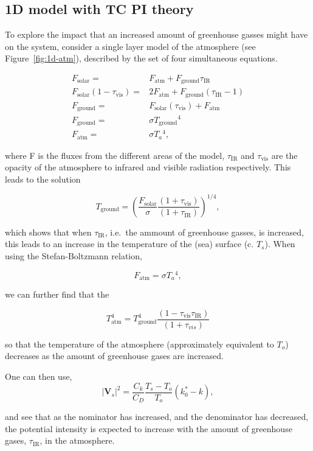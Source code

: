 \subsection{1D model with TC PI theory}
\label{sec:1d-hurr}
To explore the impact that an increased amount of greenhouse gasses might have
on the system, consider a single layer model of the atmosphere (see Figure~\ref{fig:1d-atm}), described by the
set of four simultaneous equations.



\begin{eqnarray}
F_{\mathrm{solar}} =& F_{\mathrm{atm}} + F_{\mathrm{ground}}\tau_{\mathrm{IR}}\\
F_{\mathrm{solar}}(1-\tau_{\mathrm{vis}}) =& 2F_{\mathrm{atm}} + F_{\mathrm{ground}}(\tau_{\mathrm{IR}}-1)\\
F_{\mathrm{ground}} = & F_{\mathrm{solar}}(\tau_{\mathrm{vis}}) +F_{\mathrm{atm}}  \\
F_{\mathrm{ground}} = & \sigma T_{\mathrm{ground}}{}^4 \\
F_{\mathrm{atm}} = & \sigma T_a{}^{4},
\end{eqnarray}

where F is the fluxes from the different areas of the model,
$ \tau_{\mathrm{IR}}$ and $\tau_{\mathrm{vis}}$ are the opacity of the atmosphere
to infrared and visible radiation respectively.
This leads to the solution

\begin{equation}
T_{\mathrm{ground}} = \left( \frac{F_{\mathrm{solar}}}{\sigma}\frac{(1+\tau_{\mathrm{vis}})}{(1+\tau_{\mathrm{IR}})}\right)^{1/4},
\end{equation}

which shows that when $\tau_{\mathrm{IR}}$, i.e.~the ammount of greenhouse gasses,
is increased, this leads to an increase in the temperature of the (sea) surface (c. $T_s$).
When using the Stefan-Boltzmann relation,

\begin{equation}
F_{\mathrm{atm}} = \sigma T_a{}^{4},
\end{equation}

we can further find that the

\begin{equation}
T_{\mathrm{atm}}^{4}=T_{\mathrm{ground}}^4\frac{(1-\tau_{\mathrm{vis}}\tau_{\mathrm{IR}})}{(1+\tau_{vis})}
\end{equation}

so that the temperature of the atmosphere (approximately equivalent to $T_{o}$)
decreases as the amount of greenhouse gases are increased.


One can then use,
\begin{equation}
\left|\mathbf{V}_{s}\right|^{2}=\frac{C_{k}}{C_{D}}
\frac{T_{s}-T_{o}}{T_{o}}\left(k_{0}^{*}-k\right),
\tag{PI}
\end{equation}

 and see that as the nominator has increased, and the
denominator has decreased, the potential intensity is expected to increase with the
amount of greenhouse gases, $\tau_{\mathrm{IR}}$, in the atmosphere.
